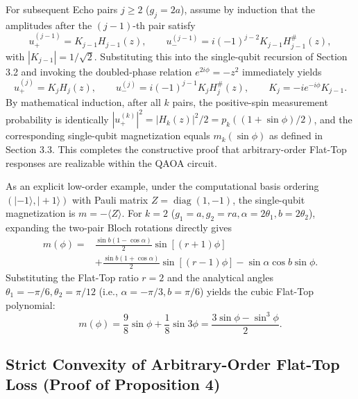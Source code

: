 \documentclass{article}
\theoremstyle{plain}
\theoremstyle{definition}
\begin{document}
For subsequent Echo pairs $j\ge 2$ ($g_j=2a$), assume by induction that the amplitudes after the $(j-1)$-th pair satisfy
\[
u_+^{(j-1)}=K_{j-1}H_{j-1}(z),\qquad
u_-^{(j-1)}=i(-1)^{j-2}K_{j-1}H_{j-1}^\#(z),
\]
with $|K_{j-1}|=1/\sqrt2$. Substituting this into the single-qubit recursion of Section 3.2 and invoking the doubled-phase relation $e^{2i\phi}=-z^2$ immediately yields
\[
u_+^{(j)}=K_jH_j(z),\qquad
u_-^{(j)}=i(-1)^{j-1}K_jH_j^\#(z),\qquad
K_j=-ie^{-i\phi}K_{j-1}.
\]
By mathematical induction, after all $k$ pairs, the positive-spin measurement probability is identically $|u_+^{(k)}|^2=|H_k(z)|^2/2=p_k((1+\sin\phi)/2)$, and the corresponding single-qubit magnetization equals $m_k(\sin\phi)$ as defined in Section 3.3. This completes the constructive proof that arbitrary-order Flat-Top responses are realizable within the QAOA circuit.

As an explicit low-order example, under the computational basis ordering $(|-1\rangle,|+1\rangle)$ with Pauli matrix $Z=\operatorname{diag}(1,-1)$, the single-qubit magnetization is $m=-\langle Z\rangle$. For $k=2$ ($g_1=a, g_2=ra, \alpha=2\theta_1, b=2\theta_2$), expanding the two-pair Bloch rotations directly gives
\[
\begin{aligned}
m(\phi)
={}&\frac{\sin b(1-\cos\alpha)}2\sin[(r+1)\phi]\\
&+\frac{\sin b(1+\cos\alpha)}2\sin[(r-1)\phi]
-\sin\alpha\cos b\sin\phi.
\end{aligned}
\]
Substituting the Flat-Top ratio $r=2$ and the analytical angles $\theta_1=-\pi/6, \theta_2=\pi/12$ (i.e., $\alpha=-\pi/3, b=\pi/6$) yields the cubic Flat-Top polynomial:
\[
m(\phi)=\frac98\sin\phi+\frac18\sin3\phi
=\frac{3\sin\phi-\sin^3\phi}{2}.
\]
\subsection{Strict Convexity of Arbitrary-Order Flat-Top Loss (Proof of Proposition 4)}\label{subsec:a_3}
\end{document}
